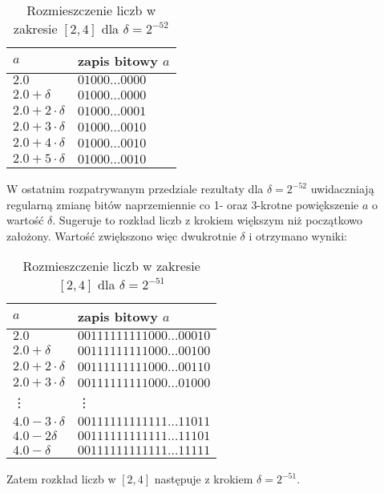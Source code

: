 \documentclass{classrep}
\begin{document}
\begin{enumerate}
		\begin{table}[!h]
        		\centering
            	\begin{tabular}{ll} \toprule
                	$a$ & {zapis bitowy $a$} \\ \midrule
                	$2.0$ & $01000\dots0000$ \\ 
 					$2.0+\delta$ & $01000\dots0000$ \\
 					$2.0+2\cdot\delta$ & $01000\dots0001$ \\
 					$2.0+3\cdot\delta$ & $01000\dots0010$ \\
 					$2.0+4\cdot\delta$ & $01000\dots0010$ \\
 					$2.0+5\cdot\delta$ & $01000\dots0010$ \\\bottomrule
            	\end{tabular}
            	\caption{Rozmieszczenie liczb w zakresie $[2,4]$ dla $\delta = 2^{-52}$}
				\label{table:7}
   			\end{table}
   			W ostatnim rozpatrywanym przedziale rezultaty dla $\delta = 2^{-52}$ uwidaczniają regularną zmianę bitów 
   			naprzemiennie co 1- oraz 3-krotne powiększenie $a$ o wartość $\delta$. Sugeruje to rozkład liczb z krokiem 
   			większym niż początkowo założony. Wartość zwiększono więc dwukrotnie $\delta$ i otrzymano wyniki:
  
   			\begin{table}[!h]
        		\centering
            	\begin{tabular}{ll} \toprule
                	$a$ & {zapis bitowy $a$} \\ \midrule
                	$2.0$ & $00111111111000\dots00010$ \\ 
 					$2.0+\delta$ & $00111111111000\dots00100$ \\
 					$2.0+2\cdot\delta$ & $00111111111000\dots00110$ \\
 					$2.0+3\cdot\delta$ & $00111111111000\dots01000$  \\
 					\vdots & \vdots \\
 					$4.0-3\cdot\delta$ & $00111111111111\dots11011$ \\
 					$4.0-2\delta$ & $00111111111111\dots11101$ \\
 					$4.0-\delta$ & $00111111111111\dots11111$ \\\bottomrule
            	\end{tabular}
            	\caption{Rozmieszczenie liczb w zakresie $[2,4]$ dla $\delta = 2^{-51}$}
			\label{table:8}
   			\end{table}
   			Zatem rozkład liczb w $[2,4]$ następuje z krokiem $\delta = 2^{-51}$.
   			
		\end{enumerate}
\end{document}
